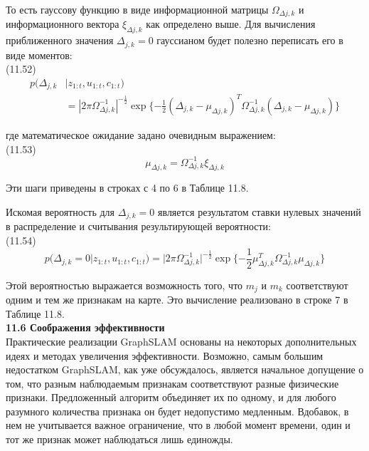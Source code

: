 \documentclass[10pt,a4paper]{article}
\begin{document}
То есть гауссову функцию в виде информационной матрицы $\varOmega_{\varDelta j,k}$ и информационного вектора $\xi_{\varDelta j,k}$ как определено выше. Для вычисления  приближенного значения $\varDelta_{j,k}=0$ гауссианом будет полезно переписать его в виде моментов:\\

(11.52)
\begin{equation*}
\begin{split}
p(\varDelta_{j,k}&|z_{1:t},u_{1:t},c_{1:t})\\
&=|2\pi\varOmega_{\varDelta j,k}^{-1}|^{-\frac{1}{2}}\exp\{-\frac{1}{2}(\varDelta_{j,k}-\mu_{\varDelta j,k})^T\varOmega_{\varDelta j,k}^{-1}(\varDelta_{j,k}-\mu_{\varDelta j,k})\}
\end{split}
\end{equation*}

где математическое ожидание задано очевидным выражением:\\

(11.53)
$$\mu_{\varDelta j,k}=\varOmega_{\varDelta j,k}^{-1}\xi_{\varDelta j,k}$$

Эти шаги приведены в строках с 4 по 6 в Таблице 11.8.

Искомая вероятность для $\varDelta_{j,k}=0$ является результатом ставки нулевых значений в распределение и считывания результирующей вероятности:\\

(11.54)
$$p(\varDelta_{j,k}=0|z_{1:t},u_{1:t},c_{1:t})=|2\pi\varOmega_{\varDelta j,k}^{-1}|^{-\frac{1}{2}}\exp\{-\frac{1}{2}\mu_{\varDelta j,k}^T\varOmega_{\varDelta j,k}^{-1}\mu_{\varDelta j,k}\}$$

Этой вероятностью выражается возможность того, что $m_j$ и $m_k$ соответствуют одним и тем же признакам на карте. Это вычисление реализовано в строке 7 в Таблице 11.8.\\

\textbf{11.6	Соображения эффективности}\\

Практические реализации GraphSLAM основаны на некоторых дополнительных идеях и методах увеличения эффективности. Возможно, самым большим недостатком GraphSLAM, как уже обсуждалось, является начальное допущение о том, что разным наблюдаемым признакам соответствуют разные физические признаки. Предложенный алгоритм объединяет их по одному, и для любого разумного количества признака он будет недопустимо медленным.  Вдобавок, в нем не учитывается важное ограничение, что в любой момент времени, один и тот же признак может наблюдаться лишь единожды.
\end{document}
